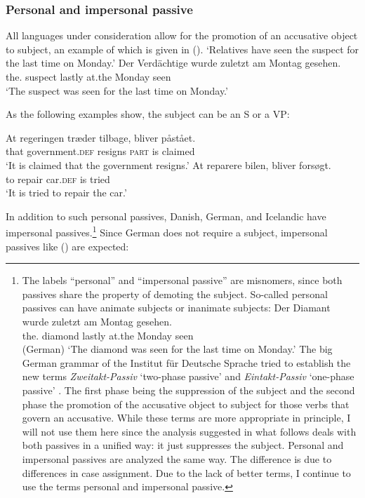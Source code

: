 \subsubsection{Personal and impersonal passive}
\label{sec-impersonal-passive-phen}

All languages under consideration allow for the promotion of an accusative object to subject, an
example of which is given in ().
\eal
\ex
{}
\glt `Relatives have seen the suspect for the last time on Monday.'
\ex 
\gll Der        Verdächtige wurde  zuletzt am Montag gesehen.\\
     the.\NOM{} suspect     \AUX{} lastly at.the Monday seen\\
\glt `The suspect was seen for the last time on Monday.'
\zl

\noindent
As the following examples show, the subject can be an S or a VP:

\eal
\ex
\gll At regeringen træder tilbage, bliver påstået.\\
     that government.\textsc{def} resigns \textsc{part} is claimed\\\danish
\glt `It is claimed that the government resigns.'
\ex
\gll At reparere bilen, bliver forsøgt.\\
     to repair car.\textsc{def} is tried\\
\glt `It is tried to repair the car.'
\zl

\noindent
In addition to such personal passives, Danish, German, and Icelandic have impersonal
passives.\footnote{
The labels ``personal'' and ``impersonal passive'' are misnomers, since both passives share the property of
demoting the subject. So-called personal passives can have animate subjects or inanimate subjects:
\ea 
\gll Der        Diamant wurde  zuletzt am Montag gesehen.\\
     the.\NOM{} diamond \AUX{} lastly at.the Monday seen\\\hfill(German)
\glt `The diamond was seen for the last time on Monday.'
\z
The big German grammar of the Institut für Deutsche Sprache tried to establish the new terms \emph{Zweitakt-Passiv} `two-phase passive' and
\emph{Eintakt-Passiv} `one-phase passive' \citep[]{Zifonun97b}. The first phase being the suppression of the subject and
the second phase the promotion of the accusative object to subject for those verbs that govern an
accusative. While these terms are more appropriate in principle, I will not use them here since the
analysis suggested in what follows deals with both passives in a unified way: it just suppresses the
subject. Personal and impersonal passives are analyzed the same way. The difference is due to
differences in case assignment. Due to the lack of better terms, I continue to use the terms personal and
impersonal passive.
} Since German does not require a subject, impersonal passives like () are expected:


